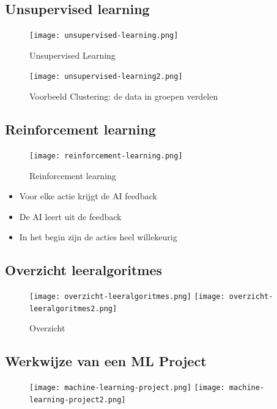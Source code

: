 \documentclass{article}
\begin{document}
\subsection{Unsupervised learning}

\begin{figure}[H]
    \centering
    \texttt{[image: unsupervised-learning.png]}
    \caption{Unsupervised Learning}
\end{figure}

\begin{figure}[H]
    \centering
    \texttt{[image: unsupervised-learning2.png]}
    \caption{Voorbeeld Clustering: de data in groepen verdelen}
\end{figure}

\subsection{Reinforcement learning}

\begin{figure}[H]
    \centering
    \texttt{[image: reinforcement-learning.png]}
    \caption{Reinforcement learning}
\end{figure}

\begin{itemize}
    \item Voor elke actie krijgt de AI feedback
    \item De AI leert uit de feedback
    \item In het begin zijn de acties heel willekeurig
\end{itemize}

\subsection{Overzicht leeralgoritmes}

\begin{figure}[H]
    \centering
    \texttt{[image: overzicht-leeralgoritmes.png]}
    \texttt{[image: overzicht-leeralgoritmes2.png]}
    \caption{Overzicht}
\end{figure}

\subsection{Werkwijze van een ML Project}

\begin{figure}[H]
    \centering
    \texttt{[image: machine-learning-project.png]}
    \texttt{[image: machine-learning-project2.png]}
\end{figure}
\end{document}
